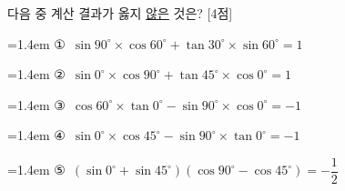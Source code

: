 다음 중 계산 결과가 옳지 \underline{않은} 것은? \mbox{[4점]}
\par\medskip\par\noindent\hangindent=1.4em {\small ①}\ $\sin 90^\circ\times\cos 60^\circ+\tan 30^\circ\times\sin 60^\circ=1$\par\noindent\hangindent=1.4em {\small ②}\ $\sin 0^\circ\times\cos 90^\circ+\tan 45^\circ\times\cos 0^\circ=1$\par\noindent\hangindent=1.4em {\small ③}\ $\cos 60^\circ\times\tan 0^\circ-\sin 90^\circ\times\cos 0^\circ=-1$\par\noindent\hangindent=1.4em {\small ④}\ $\sin 0^\circ\times\cos 45^\circ-\sin 90^\circ\times\tan 0^\circ=-1$\par\noindent\hangindent=1.4em {\small ⑤}\ $(\sin 0^\circ+\sin 45^\circ)(\cos 90^\circ-\cos 45^\circ)=-\dfrac{1}{2}$\par\medskip
